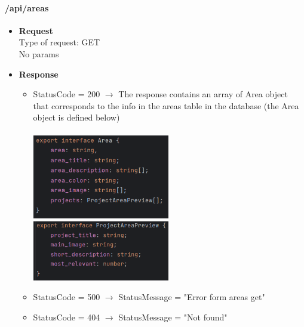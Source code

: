 \documentclass[11pt, letterpaper]{article}
\begin{document}
\paragraph{/api/areas}
\begin{itemize}
    \item \textbf{Request} \\ Type of request: GET \\No params 
    \item \textbf{Response} \begin{itemize}
        \item StatusCode = 200 $\rightarrow$ The response contains an array of Area object that corresponds to the info in the areas table in the database (the Area object is defined below)\\ \\
            \includegraphics[width=6cm]{images/API/Area.png} \includegraphics[width=6cm]{images/API/ProjectAreaPreview.png}
        \item StatusCode = 500 $\rightarrow$ StatusMessage = "Error form areas get"
        \item StatusCode = 404 $\rightarrow$ StatusMessage = "Not found"
    \end{itemize} 
\end{itemize}
\end{document}
